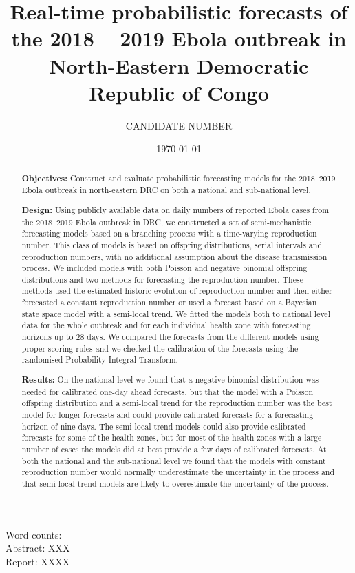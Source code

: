 \documentclass[12pt]{article}
\title{Real-time probabilistic forecasts of the 2018 -- 2019 Ebola outbreak in North-Eastern Democratic \\Republic of Congo}
\author{
  CANDIDATE NUMBER
}
\date{\today}
\begin{document}
\maketitle


Word counts:\\
Abstract: XXX\\
Report: XXXX

\begin{abstract}
  {\bf Objectives:} Construct and evaluate probabilistic forecasting models for the 2018--2019 Ebola outbreak in north-eastern DRC on both a national and sub-national level.
  
  \medskip
  
  {\bf Design:} Using publicly available data on daily numbers of reported Ebola cases from the 2018--2019 Ebola outbreak in DRC, we constructed a set of semi-mechanistic forecasting models based on a branching process with a time-varying reproduction number. This class of models is based on offspring distributions, serial intervals and reproduction numbers, with no additional assumption about the disease transmission process. We included models with both Poisson and negative binomial offspring distributions and two methods for forecasting the reproduction number. These methods used the estimated historic evolution of reproduction number and then either forecasted a constant reproduction number or used a forecast based on a Bayesian state space model with a semi-local trend. We fitted the models both to national level data for the whole outbreak and for each individual health zone with forecasting horizons up to 28 days. We compared the forecasts from the different models using proper scoring rules and we checked the calibration of the forecasts using the randomised Probability Integral Transform. 

  \medskip
  
  {\bf Results:} On the national level we found that a negative binomial distribution was needed for calibrated one-day ahead forecasts, but that the model with a Poisson offspring distribution and a semi-local trend for the reproduction number was the best model for longer forecasts and could provide calibrated forecasts for a forecasting horizon of nine days. The semi-local trend models could also provide calibrated forecasts for some of the health zones, but for most of the health zones with a large number of cases the models did at best provide a few days of calibrated forecasts. At both the national and the sub-national level we found that the models with constant reproduction number would normally underestimate the uncertainty in the process and that semi-local trend models are likely to overestimate the uncertainty of the process. 


\end{abstract}
\end{document}
